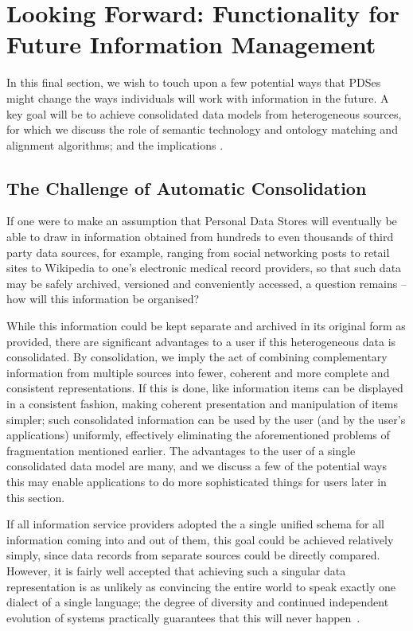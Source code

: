 \documentclass[graybox]{svmult}
\begin{document}
\section{Looking Forward: Functionality for Future Information Management}

In this final section, we wish to touch upon a few potential ways that PDSes might change the ways individuals will work with information in the future.  A key goal will be to achieve consolidated data models from heterogeneous sources, for which we discuss the role of semantic technology and ontology matching and alignment algorithms; and the implications .

\subsection{The Challenge of Automatic Consolidation}

If one were to make an assumption that Personal Data Stores will eventually be able to draw in information obtained from hundreds to even thousands of third party data sources, for example, ranging from social networking posts to retail sites to Wikipedia to one’s electronic medical record providers, so that such data may be safely archived, versioned and conveniently accessed, a question remains -- how will this information be organised?

While this information could be kept separate and archived in its original form as provided, there are significant advantages to a user if this heterogeneous data is consolidated.  By consolidation, we imply the act of combining complementary information from multiple sources into fewer, coherent and more complete and consistent representations.  If this is done, like information items can be displayed in a consistent fashion, making coherent presentation and manipulation of items simpler; such consolidated information can be used by the user (and by the user’s applications) uniformly, effectively eliminating the  aforementioned problems of fragmentation mentioned earlier. The advantages to the user of  a single consolidated data model are many, and we discuss a few of the potential ways this may enable applications to do more sophisticated things for users later in this section.

If all information service providers adopted the a single unified schema for all information coming into and out of them, this goal could be achieved relatively simply, since data records from separate sources could be directly compared.  However, it is fairly well accepted that achieving such a singular data representation is as unlikely as convincing the entire world to speak exactly one dialect of a single language; the degree of diversity and continued independent evolution of systems practically guarantees that this will never happen~\cite{bannon1997constructing}. 
\end{document}
